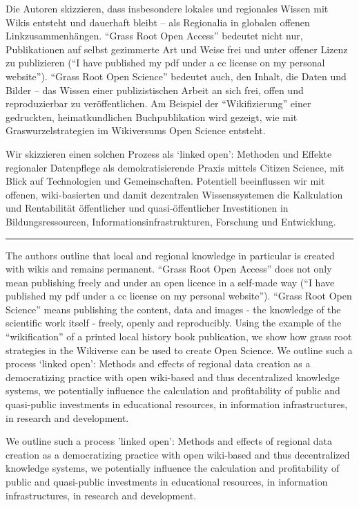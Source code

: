 Die Autoren skizzieren, dass insbesondere lokales und regionales Wissen
mit Wikis entsteht und dauerhaft bleibt -- als Regionalia in globalen
offenen Linkzusammenhängen. ``Grass Root Open Access'' bedeutet nicht
nur, Publikationen auf selbst gezimmerte Art und Weise frei und unter
offener Lizenz zu publizieren (``I have published my pdf under a cc
license on my personal website''). ``Grass Root Open Science'' bedeutet
auch, den Inhalt, die Daten und Bilder -- das Wissen einer
publizistischen Arbeit an sich frei, offen und reproduzierbar zu
veröffentlichen. Am Beispiel der ``Wikifizierung'' einer gedruckten,
heimatkundlichen Buchpublikation wird gezeigt, wie mit
Graswurzelstrategien im Wikiversums Open Science entsteht.

Wir skizzieren einen solchen Prozess als `linked open': Methoden und
Effekte regionaler Datenpflege als demokratisierende Praxis mittels
Citizen Science, mit Blick auf Technologien und Gemeinschaften.
Potentiell beeinflussen wir mit offenen, wiki-basierten und damit
dezentralen Wissenssystemen die Kalkulation und Rentabilität
öffentlicher und quasi-öffentlicher Investitionen in Bildungsressourcen,
Informationsinfrastrukturen, Forschung und Entwicklung.

\begin{center}\rule{0.5\linewidth}{0.5pt}\end{center}

The authors outline that local and regional knowledge in particular is
created with wikis and remains permanent. ``Grass Root Open Access''
does not only mean publishing freely and under an open licence in a
self-made way (``I have published my pdf under a cc license on my
personal website''). ``Grass Root Open Science'' means publishing the
content, data and images - the knowledge of the scientific work itself -
freely, openly and reproducibly. Using the example of the
``wikification'' of a printed local history book publication, we show
how grass root strategies in the Wikiverse can be used to create Open
Science. We outline such a process `linked open': Methods and effects of
regional data creation as a democratizing practice with open wiki-based
and thus decentralized knowledge systems, we potentially influence the
calculation and profitability of public and quasi-public investments in
educational resources, in information infrastructures, in research and
development.

We outline such a process 'linked open': Methods and effects of regional data creation as a democratizing practice with open wiki-based and thus decentralized knowledge systems, we potentially influence the calculation and profitability of public and quasi-public investments in educational resources, in information infrastructures, in research and development.
